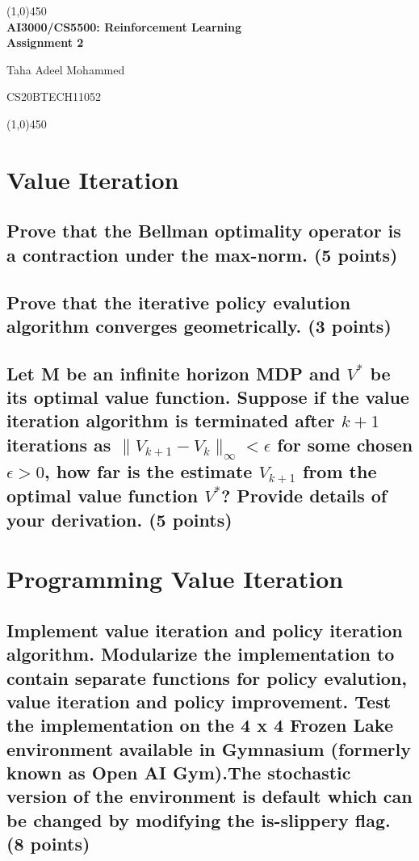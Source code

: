 \documentclass{article}
\renewcommand{\author}{Taha Adeel Mohammed}
\newcommand{\rollnumber}{CS20BTECH11052}
\newcommand{\course}{AI3000/CS5500: Reinforcement Learning}
\newcommand{\assignment}{Assignment 2}
\renewcommand{\maketitle}{
	\begin{center}
		\line(1,0){450} \\
		\vspace*{1ex}
        \Large{\textbf{\course}} \\
        \Large{\textbf{\assignment}} \\
    \end{center}
	\large{\author}
	\begin{flushright}
		\vspace*{-5ex}
		\rollnumber \\
	\end{flushright}
	\begin{center}
		\vspace*{-1ex}
		\line(1,0){450}
	\end{center}
}
\begin{document}
\maketitle

\section{Value Iteration}

\subsection{Prove that the Bellman optimality operator is a contraction under the max-norm. (5 points)}



\subsection{Prove that the iterative policy evalution algorithm converges geometrically. (3 points)}



\subsection{Let M be an infinite horizon MDP and $V^*$ be its optimal value function. Suppose if the value iteration algorithm is terminated after $k + 1$ iterations as $\|V_{k+1} - V_k\|_\infty < \epsilon$ for some chosen $\epsilon > 0$, how far is the estimate $V_{k+1}$ from the optimal value function $V^*$? Provide details of your derivation. (5 points)}



\section{Programming Value Iteration}

\subsection{Implement value iteration and policy iteration algorithm. Modularize the implementation to contain separate functions for policy evalution, value iteration and policy improvement. Test the implementation on the 4 x 4 Frozen Lake environment available in Gymnasium (formerly known as Open AI Gym).The stochastic version of the environment is default which can be changed by modifying the is-slippery flag. (8 points)}
\end{document}
